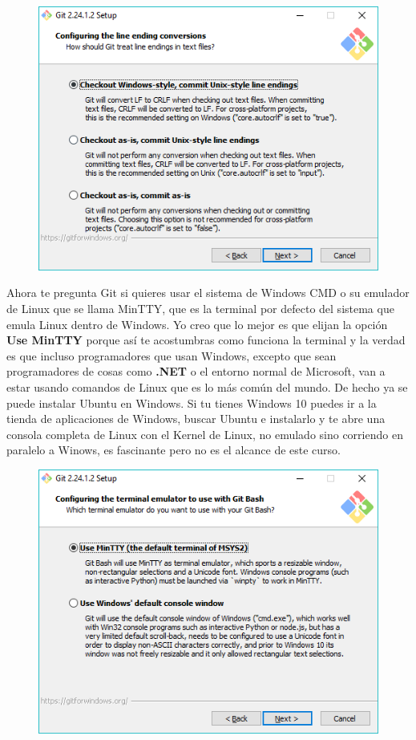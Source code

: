 \documentclass{article}
\begin{document}
\begin{figure}[h!]
  \centering
  \includegraphics[scale=0.65]{./Pictures/019_install_git.png}
\end{figure}

Ahora te pregunta Git si quieres usar el sistema de Windows CMD o su emulador
de Linux que se llama MinTTY, que es la terminal por defecto del sistema que
emula Linux dentro de Windows. Yo creo que lo mejor es que elijan la opción
\textbf{Use MinTTY} porque así te acostumbras como funciona la terminal y la
verdad es que incluso programadores que usan Windows, excepto que sean
programadores de cosas como \textbf{.NET} o el entorno normal de Microsoft, van
a estar usando comandos de Linux que es lo más común del mundo. De hecho ya se
puede instalar Ubuntu en Windows. Si tu tienes Windows 10 puedes ir a la tienda
de aplicaciones de Windows, buscar Ubuntu e instalarlo y te abre una consola
completa de Linux con el Kernel de Linux, no emulado sino corriendo en paralelo
a Winows, es fascinante pero no es el alcance de este curso.\\

\begin{figure}[h!]
  \centering
  \includegraphics[scale=0.65]{./Pictures/020_install_git.png}
\end{figure}
\end{document}
